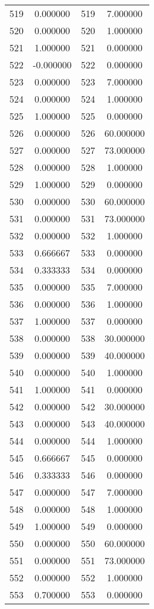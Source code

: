 \documentclass[12pt]{article}
\begin{document}
\begin{longtable}{@{}cccc@{}}
519 & 0.000000 & 519 & 7.000000 \\
520 & 0.000000 & 520 & 1.000000 \\
521 & 1.000000 & 521 & 0.000000 \\
522 & -0.000000 & 522 & 0.000000 \\
523 & 0.000000 & 523 & 7.000000 \\
524 & 0.000000 & 524 & 1.000000 \\
525 & 1.000000 & 525 & 0.000000 \\
526 & 0.000000 & 526 & 60.000000 \\
527 & 0.000000 & 527 & 73.000000 \\
528 & 0.000000 & 528 & 1.000000 \\
529 & 1.000000 & 529 & 0.000000 \\
530 & 0.000000 & 530 & 60.000000 \\
531 & 0.000000 & 531 & 73.000000 \\
532 & 0.000000 & 532 & 1.000000 \\
533 & 0.666667 & 533 & 0.000000 \\
534 & 0.333333 & 534 & 0.000000 \\
535 & 0.000000 & 535 & 7.000000 \\
536 & 0.000000 & 536 & 1.000000 \\
537 & 1.000000 & 537 & 0.000000 \\
538 & 0.000000 & 538 & 30.000000 \\
539 & 0.000000 & 539 & 40.000000 \\
540 & 0.000000 & 540 & 1.000000 \\
541 & 1.000000 & 541 & 0.000000 \\
542 & 0.000000 & 542 & 30.000000 \\
543 & 0.000000 & 543 & 40.000000 \\
544 & 0.000000 & 544 & 1.000000 \\
545 & 0.666667 & 545 & 0.000000 \\
546 & 0.333333 & 546 & 0.000000 \\
547 & 0.000000 & 547 & 7.000000 \\
548 & 0.000000 & 548 & 1.000000 \\
549 & 1.000000 & 549 & 0.000000 \\
550 & 0.000000 & 550 & 60.000000 \\
551 & 0.000000 & 551 & 73.000000 \\
552 & 0.000000 & 552 & 1.000000 \\
553 & 0.700000 & 553 & 0.000000 \\

\end{longtable}
\end{document}
